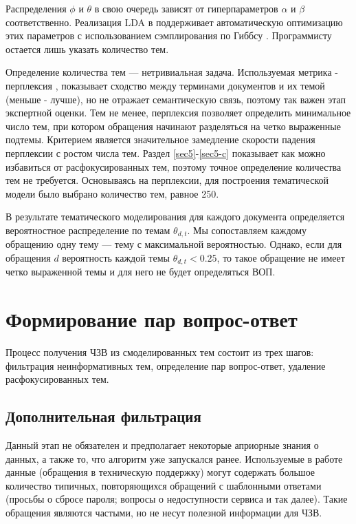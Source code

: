 Распределения $\phi$ и $\theta$ в свою очередь зависят от гиперпараметров $\alpha$ и $\beta$ соответственно. Реализация LDA в \cite{MALLET} поддерживает автоматическую оптимизацию этих параметров с использованием сэмплирования по Гиббсу \cite{gibbs}. Программисту остается лишь указать количество тем.

Определение количества тем --- нетривиальная задача. Используемая метрика - перплексия \cite{LDA}, показывает сходство между терминами документов и их темой (меньше - лучше), но не отражает семантическую связь, поэтому так важен этап экспертной оценки. Тем не менее, перплексия позволяет определить минимальное число тем, при котором обращения начинают разделяться на четко выраженные подтемы. Критерием является значительное замедление скорости падения перплексии с ростом числа тем. Раздел \ref{sec5}-\ref{sec5-c} показывает как можно избавиться от расфокусированных тем, поэтому точное определение количества тем не требуется. Основываясь на перплексии, для построения тематической модели было выбрано количество тем, равное 250.

В результате тематического моделирования для каждого документа определяется вероятностное распределение по темам $\theta_{d,t}$. Мы сопоставляем каждому обращению одну тему --- тему с максимальной вероятностью. Однако, если для обращения $d$ вероятность каждой темы $\theta_{d,t}<0.25$, то такое обращение не имеет четко выраженной темы и для него не будет определяться ВОП.

\section{Формирование пар вопрос-ответ}
\label{sec:qaforming}

Процесс получения ЧЗВ из смоделированных тем состоит из трех шагов: фильтрация неинформативных тем, определение пар вопрос-ответ, удаление расфокусированных тем.

\subsection{Дополнительная фильтрация}
\label{subsec:topicfilter}

Данный этап не обязателен и предполагает некоторые априорные знания о данных, а также то, что алгоритм уже запускался ранее. Используемые в работе данные (обращения в техническую поддержку) могут содержать большое количество типичных, повторяющихся обращений с шаблонными ответами (просьбы о сбросе пароля; вопросы о недоступности сервиса и так далее). Такие обращения являются частыми, но не несут полезной информации для ЧЗВ.


